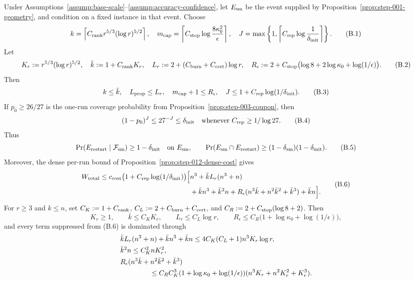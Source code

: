 \begin{proposition}\label{prop:rate-specialization-bridge}
Under Assumptions~\ref{assump:base-scale}--\ref{assump:accuracy-confidence},
let $E_{\rm sm}$ be the event supplied by
Proposition~\ref{prop:step-001-geometry}, and condition on a fixed instance in
that event. Choose
\[
 k=\left\lceil C_{\rm rank}r^{5/3}(\log r)^{5/2}\right\rceil,
 \quad m_{\rm cap}=\left\lceil C_{\rm stop}\log\frac{8\kappa _0^2}{\epsilon}\right\rceil,
 \quad J=\max\left\{1,\left\lceil C_{\rm rep}\log\frac1{\delta_{\rm init}}\right\rceil\right\}.
\tag{B.1}
\]
Let
\[
 K_r:=r^{5/3}(\log r)^{5/2},\quad
 \bar k:=1+C_{\rm rank}K_r,\quad
 L_r:=2+(C_{\rm burn}+C_{\rm cert})\log r,\quad
 R_\epsilon:=2+C_{\rm stop}\bigl(\log 8+2\log\kappa _0+\log(1/\epsilon)\bigr).
\tag{B.2}
\]
Then
\[
 k\le\bar k,\quad
 L_{\rm prop}\le L_r,\quad
 m_{\rm cap}+1\le R_\epsilon,\quad
 J\le1+C_{\rm rep}\log(1/\delta_{\rm init}).
\tag{B.3}
\]
If $p_0\ge26/27$ is the one-run coverage probability from
Proposition~\ref{prop:step-003-coupon}, then
\[
 (1-p_0)^J\le27^{-J}\le\delta_{\rm init}
 \quad\text{whenever }C_{\rm rep}\ge1/\log 27.
\tag{B.4}
\]
Thus
\[
\Pr(E_{\rm restart}\mid\mathcal F_{\rm sm})\ge1-\delta_{\rm init}
\quad\text{on }E_{\rm sm},\qquad
\Pr(E_{\rm sm}\cap E_{\rm restart})
\ge(1-\delta_{\rm sm})(1-\delta_{\rm init}).
\tag{B.5}
\]
Moreover, the dense per-run bound of
Proposition~\ref{prop:step-012-dense-cost} gives
\[
\begin{aligned}
W_{\rm total}
\le c_{\rm cost}\bigl(1+C_{\rm rep}\log(1/\delta_{\rm init})\bigr)
\Big[&n^3+\bar kL_r(n^3+n)\\
&+\bar k n^3+\bar k^2n
+R_\epsilon(n^3\bar k+n^2\bar k^2+\bar k^3)+\bar k n\Big].
\end{aligned}
\tag{B.6}
\]
For $r\ge3$ and $k\le n$, set
$C_K:=1+C_{\rm rank}$,
$C_L:=2+C_{\rm burn}+C_{\rm cert}$, and
$C_R:=2+C_{\rm stop}(\log8+2)$. Then
\[
K_r\ge1,\qquad \bar k\le C_KK_r,\qquad
L_r\le C_L\log r,\qquad
R_\epsilon\le C_R\bigl(1+\log\kappa _0+\log(1/\epsilon)\bigr),
\tag{B.7}
\]
and every term suppressed from (B.6) is dominated through
\[
\begin{aligned}
&\bar kL_r(n^3+n)+\bar k n^3+\bar k n
 \le4C_K(C_L+1)n^3K_r\log r,\\
&\bar k^2n\le C_K^2nK_r^2,\\
&R_\epsilon(n^3\bar k+n^2\bar k^2+\bar k^3)\\
&\hspace{15mm}\le C_RC_K^3
 (1+\log\kappa _0+\log(1/\epsilon))
 (n^3K_r+n^2K_r^2+K_r^3).

\end{aligned}\]
\end{proposition}
